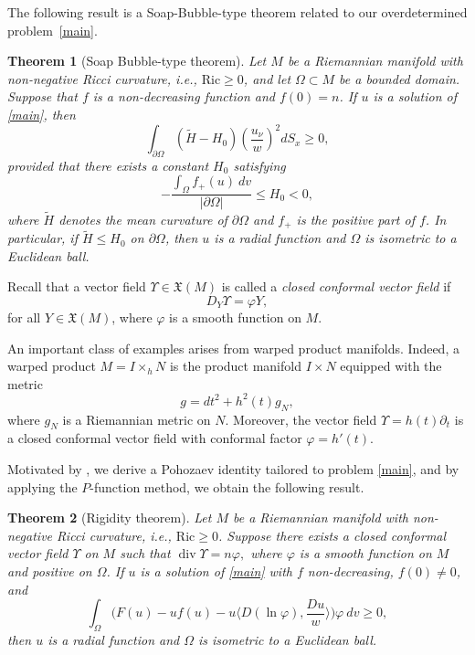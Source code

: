 \documentclass[12pt]{amsart}
\theoremstyle{plain}
\newtheorem{theorem}{\bf Theorem}
\numberwithin{equation}{section}
\begin{document}
The following result is a Soap-Bubble-type theorem related to our overdetermined problem~\eqref{main}.

\begin{theorem}[Soap Bubble-type theorem]\label{Soap}
Let \( M \) be a Riemannian manifold with non-negative Ricci curvature, i.e., \( \mathrm{Ric} \geq 0 \), and let \( \Omega \subset M \) be a bounded domain. Suppose that $f$ is a non-decreasing function and \( f(0) = n \). If \( u \) is a solution of \eqref{main}, then
\[
\int_{\partial\Omega} (\widetilde{H} - H_0) \left(\frac{u_\nu}{w}\right)^2dS_x \geq 0,
\]
provided that there exists a constant \( H_0 \) satisfying
\[
-\frac{\int_\Omega f_{+}(u)~dv}{|\partial\Omega|} \leq H_0 < 0,
\]
where \( \widetilde{H} \) denotes the mean curvature of \( \partial\Omega \) and \(f_{+}\) is the positive part of $f$. In particular, if \( \widetilde{H} \leq H_0 \) on \( \partial\Omega \), then $u$ is a radial function and \( \Omega \) is isometric to a Euclidean ball.
\end{theorem}

Recall that a vector field \( \Upsilon \in \mathfrak{X}(M) \) is called a \emph{closed conformal vector field} if
\[
D_Y \Upsilon = \varphi Y,
\]
for all \( Y \in \mathfrak{X}(M) \), where \( \varphi \) is a smooth function on \( M \).

An important class of examples arises from warped product manifolds. Indeed, a warped product \( M = I \times_h N \) is the product manifold \( I \times N \) equipped with the metric
\[
g = dt^2 + h^2(t) g_N,
\]
where \( g_N \) is a Riemannian metric on \( N \). Moreover, the vector field \( \Upsilon = h(t) \partial_t \) is a closed conformal vector field with conformal factor \( \varphi = h'(t) \).

Motivated by \cite{jia}, we derive a Pohozaev identity tailored to problem \eqref{main}, and by applying the \( P \)-function method, we obtain the following result.

\begin{theorem}[Rigidity theorem]\label{rigidity}
Let \( M \) be a Riemannian manifold with non-negative Ricci curvature, i.e., \( \mathrm{Ric} \geq 0 \). Suppose there exists a closed conformal vector field \(\Upsilon\) on \( M \) such that \(
\operatorname{div} \Upsilon = n \varphi,
\)
where \(\varphi\) is a smooth function on \( M \) and positive on $\Omega$. If \( u \) is a solution of \eqref{main} with \( f \) non-decreasing, \( f(0) \neq 0 \), and 
\[
\int_\Omega\Big(F(u) - uf(u) - u\Big\langle D(\ln\varphi), \frac{Du}{w}\Big\rangle\Big)\varphi~dv\geq 0,
\]
then $u$ is a radial function and \( \Omega \) is isometric to a Euclidean ball.
\end{theorem}
\end{document}
